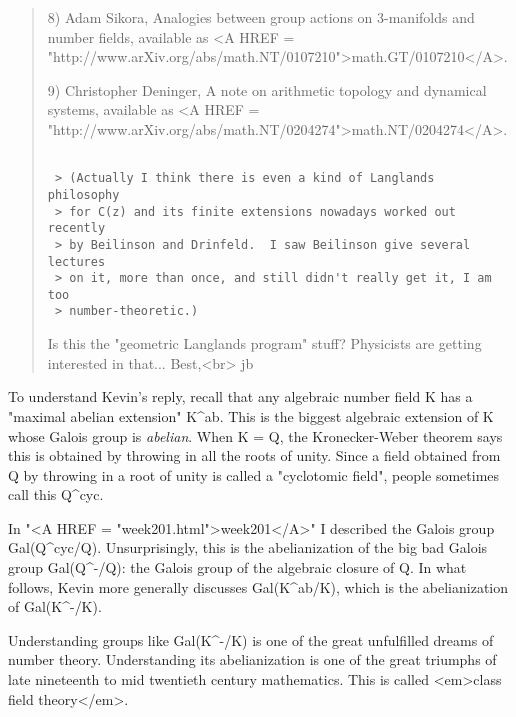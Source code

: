 \begin{quote}
8) Adam 
Sikora, Analogies between group actions on 3-manifolds and number fields,
available as <A HREF = "http://www.arXiv.org/abs/math.NT/0107210">math.GT/0107210</A>.

9) Christopher Deninger, 
A note on arithmetic topology and dynamical systems,
available as <A HREF = "http://www.arXiv.org/abs/math.NT/0204274">math.NT/0204274</A>.


\begin{verbatim}

 > (Actually I think there is even a kind of Langlands philosophy 
 > for C(z) and its finite extensions nowadays worked out recently 
 > by Beilinson and Drinfeld.  I saw Beilinson give several lectures 
 > on it, more than once, and still didn't really get it, I am too 
 > number-theoretic.)
\end{verbatim}
    

 Is this the "geometric Langlands program" stuff?  Physicists are
 getting interested in that... 
 Best,<br>
 jb
\end{quote}

To understand Kevin's reply, recall that
any algebraic number field K has a "maximal abelian extension"
K^{ab}.  This is the
biggest algebraic extension of K whose Galois group is
\emph{abelian}.  When K = Q, the Kronecker-Weber theorem says
this is obtained by throwing in all the roots of unity.
Since a field obtained from Q by throwing in a root of unity is called
a "cyclotomic field", people sometimes call this Q^{cyc}.

In "<A HREF = "week201.html">week201</A>" I described
the Galois group Gal(Q^{cyc}/Q).  Unsurprisingly,
this is the abelianization
of the big bad Galois group Gal(Q^{-}/Q): the Galois group
of the algebraic closure of Q.    In what follows,
Kevin more generally discusses Gal(K^{ab}/K), which is
the abelianization of Gal(K^{-}/K).  

Understanding groups like Gal(K^{-}/K)
is one of the great unfulfilled dreams of number theory.  Understanding
its abelianization is one of the great triumphs of late nineteenth
to mid twentieth century mathematics.  This is called <em>class field
theory</em>.

